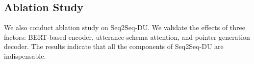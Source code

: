 \documentclass[11pt]{article}
\begin{document}
\begin{table}[!h]
\centering
{}
\caption{Accuracies of Seq2Seq-DU and baselines on M2M dataset. Seq2Seq-DU-w/oSchema significantly outperforms the baselines.}  
\label{tab:M2M}
\end{table}

\begin{table}[!h]
\centering
{}
\caption{Accuracies of Seq2Seq-DU and baselines on ATIS and SNIPS datasets. Seq2Seq-DU-SeqLabel performs comparably with Joint BERT.}  
\label{tab:ATIS_SNIPS}
\end{table}





\subsection{Ablation Study}
We also conduct ablation study on Seq2Seq-DU. We validate the effects of three factors: BERT-based encoder, utterance-schema attention, and pointer generation decoder. The results indicate that all the components of Seq2Seq-DU are indispensable.
\end{document}
